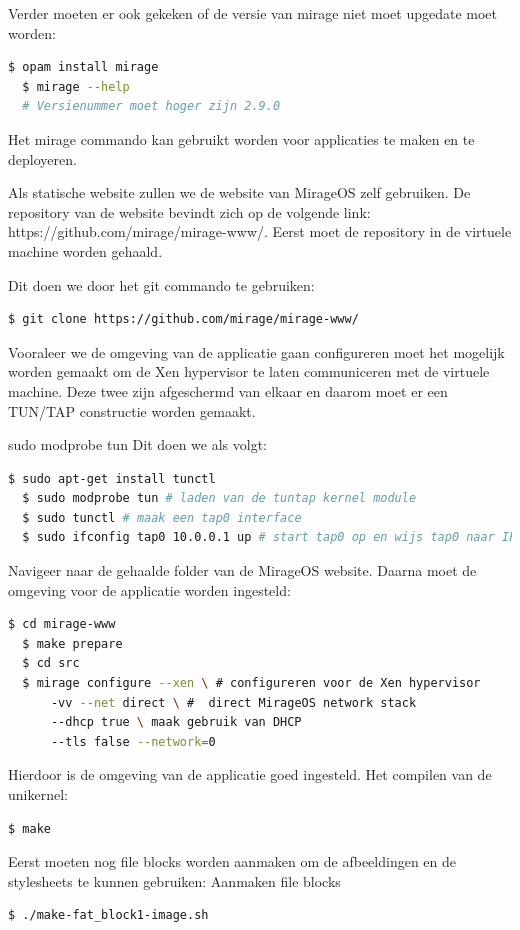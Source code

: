 \documentclass[pdftex,a4paper,12pt,twoside]{report}
\begin{document}
\noindent Verder moeten er ook gekeken of de versie van mirage niet moet upgedate moet worden:
\begin{lstlisting}[language=bash]
  $ opam install mirage
  $ mirage --help
  # Versienummer moet hoger zijn 2.9.0
\end{lstlisting}

Het mirage commando kan gebruikt worden voor applicaties te maken en te deployeren.

Als statische website zullen we de website van MirageOS zelf gebruiken. De repository van de website bevindt zich op de volgende link: https://github.com/mirage/mirage-www/. Eerst moet de repository in de virtuele machine worden gehaald. 

\noindent Dit doen we door het git commando te gebruiken:
\begin{lstlisting}[language=bash]
  $ git clone https://github.com/mirage/mirage-www/
\end{lstlisting}

Vooraleer we de omgeving van de applicatie gaan configureren moet het mogelijk worden gemaakt om de Xen hypervisor te laten communiceren met de virtuele machine. Deze twee zijn afgeschermd van elkaar en daarom moet er een TUN/TAP constructie worden gemaakt. 

sudo modprobe tun
\noindent Dit doen we als volgt:
\begin{lstlisting}[language=bash]
  $ sudo apt-get install tunctl
  $ sudo modprobe tun # laden van de tuntap kernel module
  $ sudo tunctl # maak een tap0 interface
  $ sudo ifconfig tap0 10.0.0.1 up # start tap0 op en wijs tap0 naar IP
\end{lstlisting}

Navigeer naar de gehaalde folder van de MirageOS website. 
\noindent Daarna moet de omgeving voor de applicatie worden ingesteld:
\begin{lstlisting}[language=bash]
  $ cd mirage-www
  $ make prepare
  $ cd src
  $ mirage configure --xen \ # configureren voor de Xen hypervisor
      -vv --net direct \ #  direct MirageOS network stack
      --dhcp true \ maak gebruik van DHCP
      --tls false --network=0
\end{lstlisting}

Hierdoor is de omgeving van de applicatie goed ingesteld.
\noindent Het compilen van de unikernel:
\begin{lstlisting}[language=bash]
  $ make
\end{lstlisting}

Eerst moeten nog file blocks worden aanmaken om de afbeeldingen en de stylesheets te kunnen gebruiken:
\noindent Aanmaken file blocks
\begin{lstlisting}[language=bash]
  $ ./make-fat_block1-image.sh
\end{lstlisting}
\end{document}
